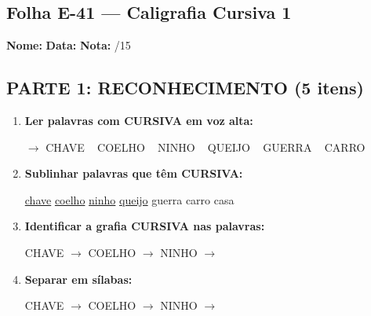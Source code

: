 \subsection{Folha E-41 --- Caligrafia Cursiva 1}
\begin{exercicio}



\noindent\textbf{Nome:} \underline{\hspace{3.2cm}} \quad \textbf{Data:} \underline{\hspace{1.6cm}} \quad \textbf{Nota:} \underline{\hspace{0.9cm}}/15


\subsection*{PARTE 1: RECONHECIMENTO (5 itens)}

\begin{enumerate}

  \item \textbf{Ler palavras com CURSIVA em voz alta:}
  \begin{center}
  $\rightarrow$ CHAVE ~ COELHO ~ NINHO ~ QUEIJO ~ GUERRA ~ CARRO
  \end{center}

  \item \textbf{Sublinhar palavras que têm CURSIVA:}

\begin{center}
  \uline{chave} \quad \uline{coelho} \quad \uline{ninho} \quad \uline{queijo} \quad guerra \quad carro \quad casa
\end{center}

  \item \textbf{Identificar a grafia CURSIVA nas palavras:}
  \begin{center}
  CHAVE $\rightarrow$ \underline{\hspace{1cm}} \quad COELHO $\rightarrow$ \underline{\hspace{1cm}} \quad NINHO $\rightarrow$ \underline{\hspace{1cm}}
  \end{center}

  \item \textbf{Separar em sílabas:}
  \begin{center}
  CHAVE $\rightarrow$ \underline{\hspace{1.2cm}} \quad COELHO $\rightarrow$ \underline{\hspace{1.2cm}} \quad NINHO $\rightarrow$ \underline{\hspace{1.2cm}}
  \end{center}


\end{enumerate}
\end{exercicio}
